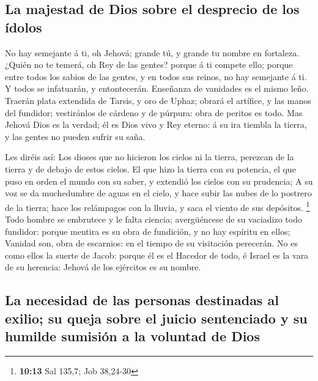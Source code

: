 \hypertarget{la-majestad-de-dios-sobre-el-desprecio-de-los-uxeddolos}{%
\subsection{La majestad de Dios sobre el desprecio de los
ídolos}\label{la-majestad-de-dios-sobre-el-desprecio-de-los-uxeddolos}}

 No hay semejante á ti, oh Jehová; grande tú, y grande tu
nombre en fortaleza.  ¿Quién no te temerá, oh Rey de las
gentes? porque á ti compete ello; porque entre todos los sabios de las
gentes, y en todos sus reinos, no hay semejante á ti.  Y
todos se infatuarán, y entontecerán. Enseñanza de vanidades es el mismo
leño.  Traerán plata extendida de Tarsis, y oro de Uphaz;
obrará el artífice, y las manos del fundidor; vestiránlos de cárdeno y
de púrpura: obra de peritos es todo.  Mas Jehová Dios es
la verdad; él es Dios vivo y Rey eterno: á su ira tiembla la tierra, y
las gentes no pueden sufrir su saña.

 Les diréis así: Los dioses que no hicieron los cielos ni
la tierra, perezcan de la tierra y de debajo de estos cielos.
 El que hizo la tierra con su potencia, el que puso en
orden el mundo con su saber, y extendió los cielos con su prudencia;
 A su voz se da muchedumbre de aguas en el cielo, y hace
subir las nubes de lo postrero de la tierra; hace los relámpagos con la
lluvia, y saca el viento de sus depósitos. \footnote{\textbf{10:13} Sal
  135,7; Job 38,24-30}  Todo hombre se embrutece y le
falta ciencia; avergüéncese de su vaciadizo todo fundidor: porque
mentira es su obra de fundición, y no hay espíritu en ellos;
 Vanidad son, obra de escarnios: en el tiempo de su
visitación perecerán.  No es como ellos la suerte de
Jacob: porque él es el Hacedor de todo, é Israel es la vara de su
herencia: Jehová de los ejércitos es su nombre.

\hypertarget{la-necesidad-de-las-personas-destinadas-al-exilio-su-queja-sobre-el-juicio-sentenciado-y-su-humilde-sumisiuxf3n-a-la-voluntad-de-dios}{%
\subsection{La necesidad de las personas destinadas al exilio; su queja
sobre el juicio sentenciado y su humilde sumisión a la voluntad de
Dios}\label{la-necesidad-de-las-personas-destinadas-al-exilio-su-queja-sobre-el-juicio-sentenciado-y-su-humilde-sumisiuxf3n-a-la-voluntad-de-dios}}

